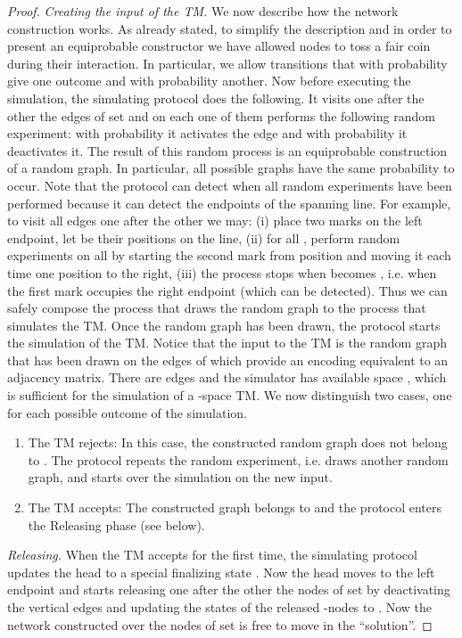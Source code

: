 \documentclass[oribibl, 11pt]{llncs}
\begin{document}
\begin{proof}
\noindent\emph{Creating the input of the TM.} We now describe how the network construction works. As already stated, to simplify the description and in order to present an equiprobable constructor we have allowed nodes to toss a fair coin during their interaction. In particular, we allow transitions that with probability  give one outcome and with probability  another. Now before executing the simulation, the simulating protocol does the following. It visits one after the other the edges of set  and on each one of them performs the following random experiment: with probability  it activates the edge and with probability  it deactivates it. The result of this random process is an equiprobable construction of a random graph. In particular, all possible graphs have the same probability to occur. Note that the protocol can detect when all random experiments have been performed because it can detect the endpoints of the spanning line. For example, to visit all edges one after the other we may: (i) place two marks on the left endpoint, let  be their positions on the line, (ii) for all , perform random experiments on all  by starting the second mark from position  and moving it each time one position to the right, (iii) the process stops when  becomes , i.e. when the first mark occupies the right endpoint (which can be detected). Thus we can safely compose the process that draws the random graph to the process that simulates the TM. Once the random graph has been drawn, the protocol starts the simulation of the TM. Notice that the input to the TM is the random graph that has been drawn on the edges of  which provide an encoding equivalent to an adjacency matrix. There are  edges and the simulator has available space , which is sufficient for the simulation of a -space TM. We now distinguish two cases, one for each possible outcome of the simulation.
\begin{enumerate}
 \item The TM rejects: In this case, the constructed random graph does not belong to . The protocol repeats the random experiment, i.e. draws another random graph, and starts over the simulation on the new input.
 \item The TM accepts: The constructed graph belongs to  and the protocol enters the Releasing phase (see below).
\end{enumerate}

\noindent\emph{Releasing.} When the TM accepts for the first time, the simulating protocol updates the head to a special finalizing state . Now the head moves to the left endpoint and starts releasing one after the other the nodes of set  by deactivating the vertical edges and updating the states of the released -nodes to . Now the network constructed over the nodes of set  is free to move in the ``solution''.


\end{proof}
\end{document}
